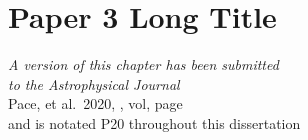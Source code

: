 \chapter[Paper 3 Short Title]{Paper 3 Long Title}
\label{chapter3}

\vfill

\begin{flushright}
    \fixspacing %
    \textit{A version of this chapter has been submitted\\
        to the \emph{Astrophysical Journal}} \\ \vspace{1ex}
    Pace, et al.\ 2020, \apj, vol, page \\ \vspace{1ex}
    and is notated P20 throughout this dissertation
\end{flushright}

\vspace*{1in} %

\cleardoublepage

\begin{chabstract}

\end{chabstract}
\cleardoublepage